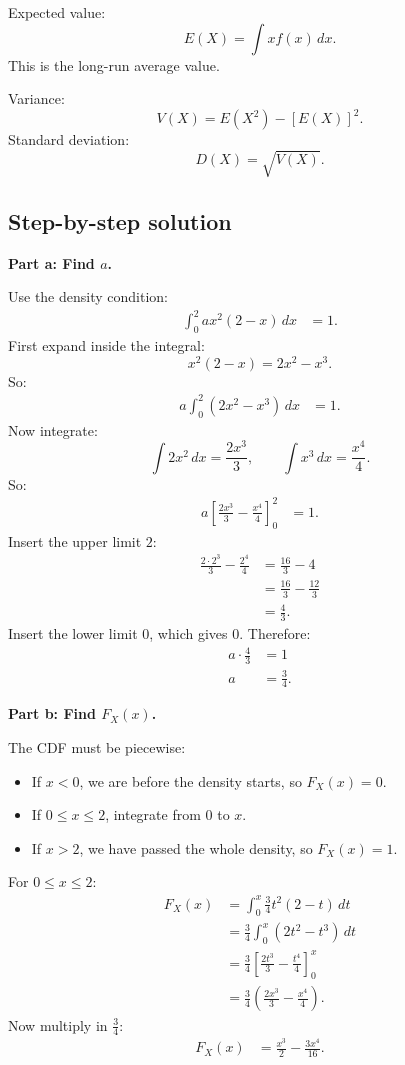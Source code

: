 \documentclass[11pt,a4paper]{article}
\begin{document}
Expected value:
\[
E(X)=\int x f(x)\,dx.
\]
This is the long-run average value.

Variance:
\[
V(X)=E(X^2)-[E(X)]^2.
\]
Standard deviation:
\[
D(X)=\sqrt{V(X)}.
\]

\subsection*{Step-by-step solution}
\textbf{Part a: Find \(a\).}

Use the density condition:
\begin{align*}
\int_0^2 a x^2(2-x)\,dx&=1.
\end{align*}
First expand inside the integral:
\[
x^2(2-x)=2x^2-x^3.
\]
So:
\begin{align*}
a\int_0^2(2x^2-x^3)\,dx&=1.
\end{align*}
Now integrate:
\[
\int 2x^2\,dx=\frac{2x^3}{3},
\qquad
\int x^3\,dx=\frac{x^4}{4}.
\]
So:
\begin{align*}
a\left[\frac{2x^3}{3}-\frac{x^4}{4}\right]_0^2&=1.
\end{align*}
Insert the upper limit \(2\):
\begin{align*}
\frac{2\cdot 2^3}{3}-\frac{2^4}{4}
&=\frac{16}{3}-4\\
&=\frac{16}{3}-\frac{12}{3}\\
&=\frac{4}{3}.
\end{align*}
Insert the lower limit \(0\), which gives \(0\). Therefore:
\begin{align*}
a\cdot \frac{4}{3}&=1\\
a&=\frac{3}{4}.
\end{align*}

\textbf{Part b: Find \(F_X(x)\).}

The CDF must be piecewise:
\begin{itemize}[leftmargin=*]
    \item If \(x<0\), we are before the density starts, so \(F_X(x)=0\).
    \item If \(0\le x\le 2\), integrate from \(0\) to \(x\).
    \item If \(x>2\), we have passed the whole density, so \(F_X(x)=1\).
\end{itemize}

For \(0\le x\le 2\):
\begin{align*}
F_X(x)
&=\int_0^x \frac{3}{4}t^2(2-t)\,dt\\
&=\frac{3}{4}\int_0^x(2t^2-t^3)\,dt\\
&=\frac{3}{4}\left[\frac{2t^3}{3}-\frac{t^4}{4}\right]_0^x\\
&=\frac{3}{4}\left(\frac{2x^3}{3}-\frac{x^4}{4}\right).
\end{align*}
Now multiply in \(\frac{3}{4}\):
\begin{align*}
F_X(x)
&=\frac{x^3}{2}-\frac{3x^4}{16}.
\end{align*}
\end{document}
